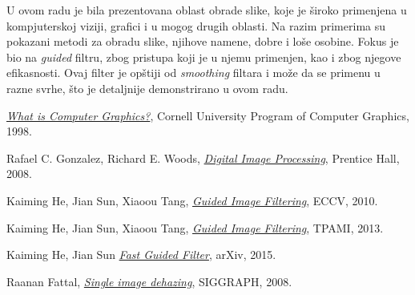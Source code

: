 \documentclass[a4paper,12pt,titlepage]{article}
\begin{document}
U ovom radu je bila prezentovana oblast obrade slike, koje je široko primenjena u kompjuterskoj viziji, grafici i u mogog drugih oblasti. Na razim primerima su pokazani metodi za obradu slike, njihove namene, dobre i loše osobine. Fokus je bio na \emph{guided} filtru, zbog pristupa koji je u njemu primenjen, kao i zbog njegove efikasnosti. Ovaj filter je opštiji od \emph{smoothing} filtara i može da se primenu u razne svrhe, što je detaljnije demonstrirano u ovom radu.

\newpage
{}
\begin{thebibliography}{10}

\emph{\href{http://www.graphics.cornell.edu/online/tutorial/}{What is Computer Graphics?}},
Cornell University Program of Computer Graphics,
1998.

Rafael C. Gonzalez, Richard E. Woods,
\emph{\href{https://books.google.rs/books?id=8uGOnjRGEzoC&redir_esc=y}{Digital Image Processing}},
Prentice Hall,
2008.

Kaiming He, Jian Sun, Xiaoou Tang,
\emph{\href{http://kaiminghe.com/publications/eccv10guidedfilter.pdf}{Guided Image Filtering}},
ECCV,
2010.

Kaiming He, Jian Sun, Xiaoou Tang,
\emph{\href{http://kaiminghe.com/publications/pami12guidedfilter.pdf}{Guided Image Filtering}},
TPAMI,
2013.

Kaiming He, Jian Sun
\emph{\href{https://arxiv.org/pdf/1505.00996.pdf}{Fast Guided Filter}},
arXiv,
2015.

Raanan Fattal,
\emph{\href{http://citeseerx.ist.psu.edu/viewdoc/download?doi=10.1.1.456.2558&rep=rep1&type=pdf}{Single image dehazing}},
SIGGRAPH,
2008.

\end{thebibliography}
\end{document}
